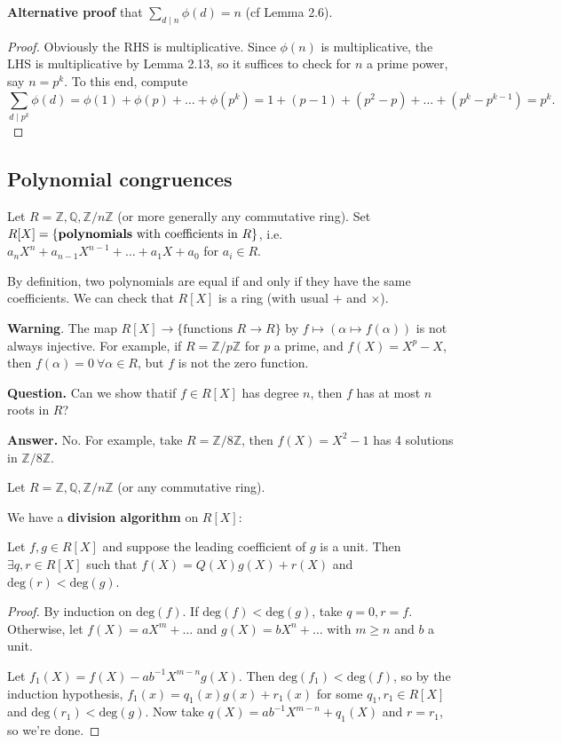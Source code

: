 \documentclass{article}
\theoremstyle{definition}
\begin{document}
\textbf{Alternative proof} that $\sum_{d \mid n}^{} \phi(d) = n$ (cf Lemma 2.6).
\begin{proof}
    Obviously the RHS is multiplicative. Since $\phi(n)$ is multiplicative, the LHS is multiplicative by Lemma 2.13, so it suffices to check for $n$ a prime power, say $n=p^k$. To this end, compute \[
    \sum_{d \mid p^k}^{} \phi(d) = \phi(1) + \phi(p) + \ldots + \phi(p^k) = 1 + (p-1) + (p^2-p) + \ldots + (p^k-p^{k-1}) = p^k.
    \]
\end{proof}

\subsection{Polynomial congruences}
Let $R = \mathbb{Z},\mathbb{Q}, \mathbb{Z}/n\mathbb{Z}$ (or more generally any commutative ring). Set $R[X] = \{\text{\textbf{polynomials} with coefficients in }R\}$, i.e. $a_n X^n + a_{n-1}X^{n-1} + \ldots + a_1 X + a_0$ for $a_i \in R$.

By definition, two polynomials are equal if and only if they have the same coefficients. We can check that $R[X]$ is a ring (with usual $+$ and $\times$).
\vspace{1mm}

\textbf{Warning}. The map $R[X] \to \{\text{functions }R \to R\}$ by $f \mapsto (\alpha \mapsto f(\alpha))$ is not always injective. For example, if $R=\mathbb{Z}/p\mathbb{Z}$ for $p$ a prime, and $f(X)=X^p - X$, then $f(\alpha)=0 ~\forall \alpha \in R$, but $f$ is not the zero function.
\vspace{1mm}

\textbf{Question.} Can we show thatif $f \in R[X]$ has degree $n$, then $f$ has at most $n$ roots in $R$?
\vspace{1mm}

\textbf{Answer.} No. For example, take $R = \mathbb{Z}/8\mathbb{Z}$, then $f(X)=X^2-1$ has 4 solutions in $\mathbb{Z}/8\mathbb{Z}$.

\vspace{1mm}

Let $R=\mathbb{Z},\mathbb{Q}, \mathbb{Z}/n\mathbb{Z}$ (or any commutative ring).

We have a \textbf{division algorithm} on $R[X]$: 

Let $f,g \in R[X]$ and suppose the leading coefficient of $g$ is a unit. Then $\exists q, r \in R[X]$ such that $f(X)=Q(X)g(X)+r(X)$ and $\text{deg}(r)<\text{deg}(g)$.

\begin{proof}
    By induction on $\text{deg}(f)$. If $\text{deg}(f) < \text{deg}(g)$, take $q=0, r=f$. Otherwise, let $f(X) = a X^m + \ldots$ and $g(X) = b X^n + \ldots$ with $m \ge n$ and $b$ a unit.
    \vspace{1mm}
    
    Let $f_1(X) = f(X)- ab^{-1}X^{m-n}g(X)$. Then $\text{deg}(f_1) < \text{deg}(f)$, so by the induction hypothesis, $f_1(x)=q_1(x)g(x) + r_1(x)$ for some $q_1,r_1 \in R[X]$ and $\text{deg}(r_1) < \text{deg}(g)$. Now take $q(X) = ab^{-1}X^{m-n} + q_1(X)$ and $r=r_1$, so we're done.
\end{proof}
\end{document}
